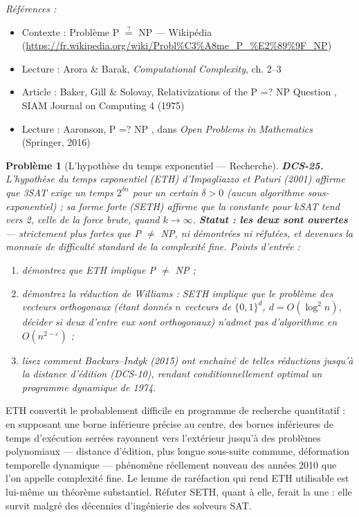 \documentclass[11pt]{article}
\newtheorem{problem}{Problème}
\newenvironment{refs}{\par\small\noindent\emph{Références :}\begin{itemize}\setlength\itemsep{0pt}}{\end{itemize}\normalsize}
\begin{document}
\begin{refs}
\item Contexte : Problème P $\stackrel{?}{=}$ NP --- Wikipédia (\url{https://fr.wikipedia.org/wiki/Probl%C3%A8me_P_%E2%89%9F_NP})
\item Lecture : Arora \& Barak, \textit{Computational Complexity}, ch. 2--3
\item Article : Baker, Gill \& Solovay, \og{} Relativizations of the P =? NP Question \fg{}, SIAM Journal on Computing 4 (1975)
\item Lecture : Aaronson, \og{} P =? NP \fg{}, dans \textit{Open Problems in Mathematics} (Springer, 2016)
\end{refs}

\bigskip

\begin{problem}[{L'hypothèse du temps exponentiel --- Recherche}]
\textbf{DCS-25.} L'hypothèse du temps exponentiel (ETH) d'Impagliazzo et Paturi (2001) affirme que 3SAT exige un temps $2^{\delta n}$ pour un certain $\delta > 0$ (aucun algorithme sous-exponentiel) ; sa forme forte (SETH) affirme que la constante pour $k$SAT tend vers 2, celle de la force brute, quand $k \to \infty$. \textbf{Statut : les deux sont ouvertes} --- strictement plus fortes que P $\ne$ NP, ni démontrées ni réfutées, et devenues la monnaie de difficulté standard de la complexité fine. Points d'entrée :
\begin{enumerate}
\item[(a)] démontrez que ETH implique P $\ne$ NP ;
\item[(b)] démontrez la réduction de Williams : SETH implique que le problème des vecteurs orthogonaux (étant donnés $n$ vecteurs de $\{0,1\}^d$, $d = O(\log^2 n)$, décider si deux d'entre eux sont orthogonaux) n'admet pas d'algorithme en $O(n^{2-\varepsilon})$ ;
\item[(c)] lisez comment Backurs--Indyk (2015) ont enchaîné de telles réductions jusqu'à la distance d'édition (DCS-10), rendant conditionnellement optimal un programme dynamique de 1974.
\end{enumerate}

\end{problem}

\noindent ETH convertit le \og{} probablement difficile \fg{} en programme de recherche quantitatif : en supposant une borne inférieure précise au centre, des bornes inférieures de temps d'exécution serrées rayonnent vers l'extérieur jusqu'à des problèmes polynomiaux --- distance d'édition, plus longue sous-suite commune, déformation temporelle dynamique --- phénomène réellement nouveau des années 2010 que l'on appelle complexité fine. Le lemme de raréfaction qui rend ETH utilisable est lui-même un théorème substantiel. Réfuter SETH, quant à elle, ferait la une : elle survit malgré des décennies d'ingénierie des solveurs SAT.
\end{document}

